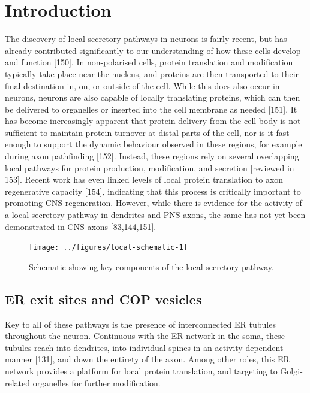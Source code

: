 \documentclass[
  12pt,
  a4paper,
]{book}
\renewcommand{\chaptermark}[1]{\markboth{#1}{}}
\begin{document}
\chaptermark{ER, ERGIC, and Golgi}

\section{Introduction}\label{introduction-2}

The discovery of local secretory pathways in neurons is fairly recent, but has already contributed significantly to our understanding of how these cells develop and function {[}150{]}. In non-polarised cells, protein translation and modification typically take place near the nucleus, and proteins are then transported to their final destination in, on, or outside of the cell. While this does also occur in neurons, neurons are also capable of locally translating proteins, which can then be delivered to organelles or inserted into the cell membrane as needed {[}151{]}. It has become increasingly apparent that protein delivery from the cell body is not sufficient to maintain protein turnover at distal parts of the cell, nor is it fast enough to support the dynamic behaviour observed in these regions, for example during axon pathfinding {[}152{]}. Instead, these regions rely on several overlapping local pathways for protein production, modification, and secretion {[}reviewed in 153{]}. Recent work has even linked levels of local protein translation to axon regenerative capacity {[}154{]}, indicating that this process is critically important to promoting CNS regeneration. However, while there is evidence for the activity of a local secretory pathway in dendrites and PNS axons, the same has not yet been demonstrated in CNS axons {[}83,144,151{]}.

\begin{figure}
\texttt{[image: ../figures/local-schematic-1]} \caption[Schematic of the local secretory pathway]{Schematic showing key components of the local secretory pathway.}\label{fig:local-schematic}
\end{figure}

\subsection{ER exit sites and COP vesicles}\label{er-exit-sites-and-cop-vesicles}

Key to all of these pathways is the presence of interconnected ER tubules throughout the neuron. Continuous with the ER network in the soma, these tubules reach into dendrites, into individual spines in an activity-dependent manner {[}131{]}, and down the entirety of the axon. Among other roles, this ER network provides a platform for local protein translation, and targeting to Golgi-related organelles for further modification.
\end{document}
